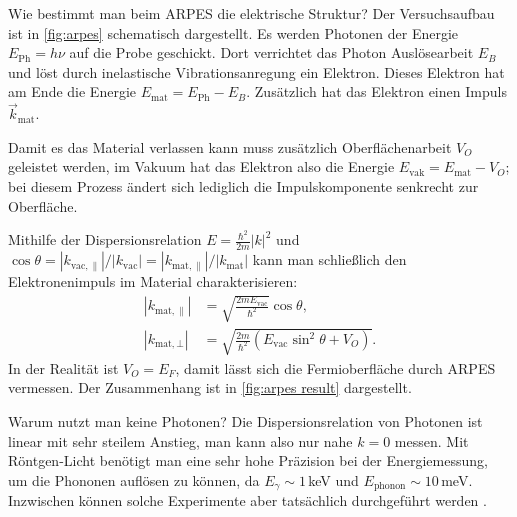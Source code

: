 \begin{fquestion}{Wie bestimmt man beim ARPES die elektrische Struktur?}
    Der Versuchsaufbau ist in \autoref{fig:arpes} schematisch dargestellt.
    Es werden Photonen der Energie $E_{\mathrm{Ph}} = h \nu$ auf die Probe geschickt. 
    Dort verrichtet das Photon Auslösearbeit $E_B$ und löst durch inelastische Vibrationsanregung ein Elektron.
    Dieses Elektron hat am Ende die Energie $E_{\mathrm{mat}} = E_{\mathrm{Ph}} - E_B$. 
    Zusätzlich hat das Elektron einen Impuls $\Vec{k}_{\mathrm{mat}}$.
    
    Damit es das Material verlassen kann muss zusätzlich Oberflächenarbeit $V_O$ geleistet werden, im Vakuum hat das Elektron also die Energie $E_{\mathrm{vak}} = E_{\mathrm{mat}} - V_O$; bei diesem Prozess ändert sich lediglich die Impulskomponente senkrecht zur Oberfläche.
    
    Mithilfe der Dispersionsrelation $E = \frac{\hbar^2}{2m} |k|^2$ und $\cos \theta = {|k_{\mathrm{vac},\parallel}|}/{|k_{\mathrm{vac}}|} = {|k_{\mathrm{mat},\parallel}|}/{|k_{\mathrm{mat}}|}$ kann man schließlich den Elektronenimpuls im Material charakterisieren:
    $$\begin{aligned} 
    |k_{\mathrm{mat}, \parallel}| &= \sqrt{\frac{2 m E_{\mathrm{vac}}}{\hbar^2}} \cos \theta, \\
    |k_{\mathrm{mat}, \bot}| &= \sqrt{\frac{2 m}{\hbar^2} (E_{\mathrm{vac}} \sin^2 \theta  + V_O)}.
    \end{aligned}$$
    In der Realität ist $V_O = E_F$, damit lässt sich die Fermioberfläche durch ARPES vermessen.
    Der Zusammenhang ist in \autoref{fig:arpes result} dargestellt.
\end{fquestion}


\begin{fquestion}{Warum nutzt man keine Photonen?}
     Die Dispersionsrelation von Photonen ist linear mit sehr steilem Anstieg, man kann also nur nahe $k=0$ messen.
     Mit Röntgen-Licht benötigt man eine sehr hohe Präzision bei der Energiemessung, um die Phononen auflösen zu können, da $E_\gamma \sim 1\,$keV und $E_\mathrm{phonon} \sim 10\,$meV.
     Inzwischen können solche Experimente aber tatsächlich durchgeführt werden \cite{Bur2000}.
\end{fquestion}


